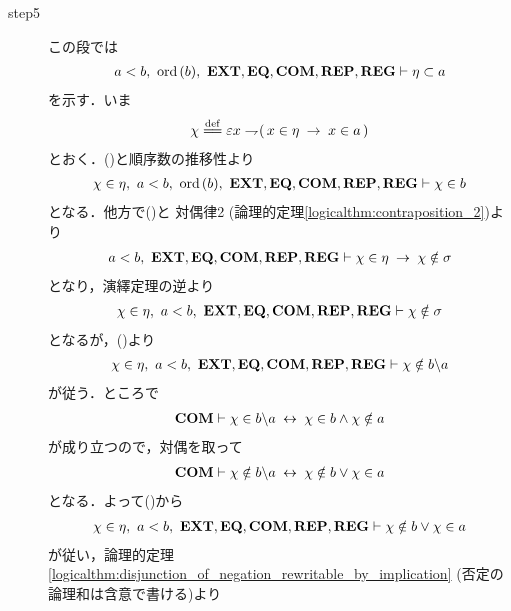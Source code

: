 \begin{prf}
\begin{description}
			\item[step5] この段では
				\begin{align}
					a < b,\ \ord{b},\ \EXTAX,\EQAX,\COMAX,\REPAX,\REGAX \vdash \eta \subset a
				\end{align}
				を示す．いま
				\begin{align}
					\chi \defeq \varepsilon x \negation (\, x \in \eta \rarrow x \in a\, )
				\end{align}
				とおく．()と順序数の推移性より
				\begin{align}
					\chi \in \eta,\ a < b,\ \ord{b},\ \EXTAX,\EQAX,\COMAX,\REPAX,\REGAX \vdash \chi \in b
					\label{fom:element_and_proper_subset_correspond_17}
				\end{align}
				となる．他方で()と
				対偶律2 (論理的定理\ref{logicalthm:contraposition_2})より
				\begin{align}
					a < b,\ \mbox{{\bf EXT}},\mbox{{\bf EQ}},\mbox{\bf COM},\mbox{{\bf REP}},\mbox{{\bf REG}} \vdash 
					\chi \in \eta \hspace{0.25em}\rightarrow\hspace{0.25em} \chi \notin \sigma
				\end{align}
				となり，演繹定理の逆より
				\begin{align}
					\chi \in \eta,\ a < b,\ \EXTAX,\EQAX,\COMAX,\REPAX,\REGAX \vdash \chi \notin \sigma
				\end{align}
				となるが，()より
				\begin{align}
					\chi \in \eta,\ a < b,\ \EXTAX,\EQAX,\COMAX,\REPAX,\REGAX \vdash \chi \notin b \backslash a
					\label{fom:element_and_proper_subset_correspond_18}
				\end{align}
				が従う．ところで
				\begin{align}
					\mbox{\bf COM} \vdash \chi \in b \backslash a \hspace{0.25em}\leftrightarrow\hspace{0.25em} \chi \in b \wedge \chi \notin a
				\end{align}
				が成り立つので，対偶を取って
				\begin{align}
					\mbox{\bf COM} \vdash \chi \notin b \backslash a \hspace{0.25em}\leftrightarrow\hspace{0.25em} \chi \notin b \vee \chi \in a
				\end{align}
				となる．よって()から
				\begin{align}
					\chi \in \eta,\ a < b,\ \EXTAX,\EQAX,\COMAX,\REPAX,\REGAX \vdash \chi \notin b \vee \chi \in a
				\end{align}
				が従い，論理的定理\ref{logicalthm:disjunction_of_negation_rewritable_by_implication}
				(否定の論理和は含意で書ける)より

\end{description}
\end{prf}
